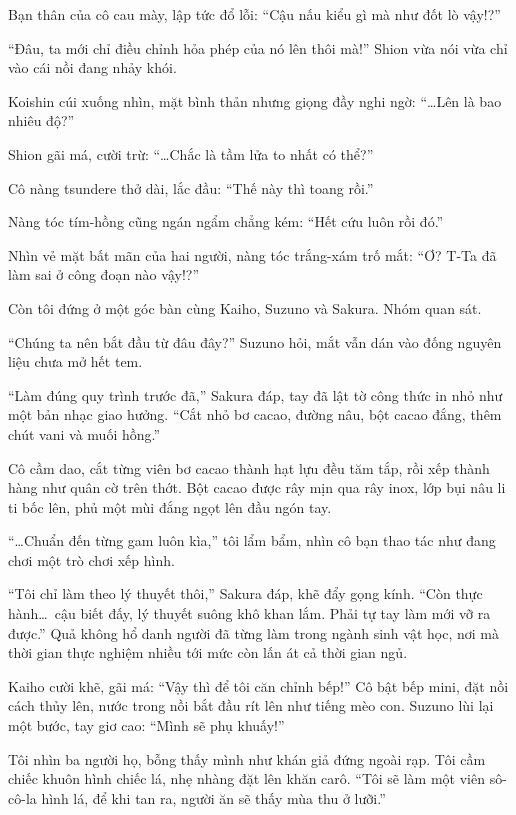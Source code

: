 \documentclass[../main.tex]{subfiles}
\begin{document}
Bạn thân của cô cau mày, lập tức đổ lỗi: ``Cậu nấu kiểu gì mà như đốt lò vậy!?''

``Đâu, ta mới chỉ điều chỉnh hỏa phép của nó lên thôi mà!'' Shion vừa nói vừa chỉ vào cái nồi đang nhảy khói.

Koishin cúi xuống nhìn, mặt bình thản nhưng giọng đầy nghi ngờ: ``\dots Lên là bao nhiêu độ?''

Shion gãi má, cười trừ: ``\dots Chắc là tầm lửa to nhất có thể?''

Cô nàng tsundere thở dài, lắc đầu: ``Thế này thì toang rồi.''

Nàng tóc tím-hồng cũng ngán ngẩm chẳng kém: ``Hết cứu luôn rồi đó.''

Nhìn vẻ mặt bất mãn của hai người, nàng tóc trắng-xám trố mắt: ``Ơ? T-Ta đã làm sai ở công đoạn nào vậy!?''

\ct

Còn tôi đứng ở một góc bàn cùng Kaiho, Suzuno và Sakura. Nhóm quan sát.

``Chúng ta nên bắt đầu từ đâu đây?'' Suzuno hỏi, mắt vẫn dán vào đống nguyên liệu chưa mở hết tem.

``Làm đúng quy trình trước đã,'' Sakura đáp, tay đã lật tờ công thức in nhỏ như một bản nhạc giao hưởng. ``Cắt nhỏ bơ cacao, đường nâu, bột cacao đắng, thêm chút vani và muối hồng.''

Cô cầm dao, cắt từng viên bơ cacao thành hạt lựu đều tăm tắp, rồi xếp thành hàng như quân cờ trên thớt. Bột cacao được rây mịn qua rây inox, lớp bụi nâu li ti bốc lên, phủ một mùi đắng ngọt lên đầu ngón tay.

``\dots Chuẩn đến từng gam luôn kìa,'' tôi lẩm bẩm, nhìn cô bạn thao tác như đang chơi một trò chơi xếp hình.

``Tôi chỉ làm theo lý thuyết thôi,'' Sakura đáp, khẽ đẩy gọng kính. ``Còn thực hành\dots\ cậu biết đấy, lý thuyết suông khô khan lắm. Phải tự tay làm mới vỡ ra được.'' Quả không hổ danh người đã từng làm trong ngành sinh vật học, nơi mà thời gian thực nghiệm nhiều tới mức còn lấn át cả thời gian ngủ.

Kaiho cười khẽ, gãi má: ``Vậy thì để tôi căn chỉnh bếp!'' Cô bật bếp mini, đặt nồi cách thủy lên, nước trong nồi bắt đầu rít lên như tiếng mèo con. Suzuno lùi lại một bước, tay giơ cao: ``Mình sẽ phụ khuấy!''

Tôi nhìn ba người họ, bỗng thấy mình như khán giả đứng ngoài rạp. Tôi cầm chiếc khuôn hình chiếc lá, nhẹ nhàng đặt lên khăn carô. ``Tôi sẽ làm một viên sô-cô-la hình lá, để khi tan ra, người ăn sẽ thấy mùa thu ở lưỡi.''
\end{document}
